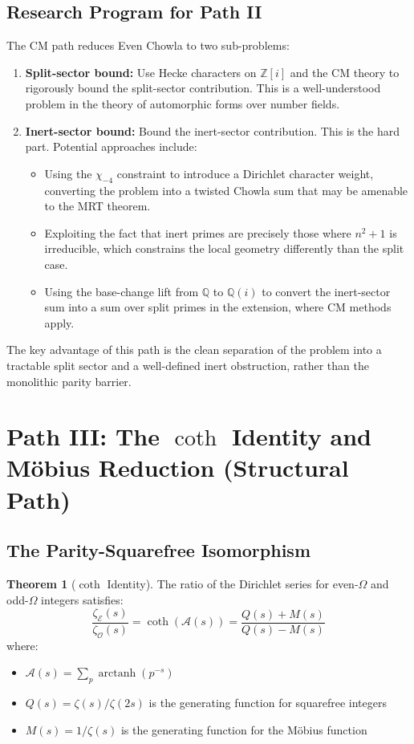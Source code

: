 \documentclass[11pt,a4paper]{article}
\theoremstyle{definition}
\newtheorem{theorem}{Theorem}[section]
\newcommand{\EE}{\mathcal{E}}
\newcommand{\OO}{\mathcal{O}}
\renewcommand{\AA}{\mathcal{A}}
\DeclareMathOperator{\arctanh}{arctanh}
\begin{document}
\subsection{Research Program for Path II}

The CM path reduces Even Chowla to two sub-problems:

\begin{enumerate}
\item \textbf{Split-sector bound:} Use Hecke characters on $\mathbb{Z}[i]$ and the CM theory to rigorously bound the split-sector contribution. This is a well-understood problem in the theory of automorphic forms over number fields.

\item \textbf{Inert-sector bound:} Bound the inert-sector contribution. This is the hard part. Potential approaches include:
\begin{itemize}
\item Using the $\chi_{-4}$ constraint to introduce a Dirichlet character weight, converting the problem into a twisted Chowla sum that may be amenable to the MRT theorem.
\item Exploiting the fact that inert primes are precisely those where $n^2+1$ is irreducible, which constrains the local geometry differently than the split case.
\item Using the base-change lift from $\mathbb{Q}$ to $\mathbb{Q}(i)$ to convert the inert-sector sum into a sum over split primes in the extension, where CM methods apply.
\end{itemize}
\end{enumerate}

The key advantage of this path is the clean separation of the problem into a tractable split sector and a well-defined inert obstruction, rather than the monolithic parity barrier.

\section{Path III: The $\coth$ Identity and M\"obius Reduction (Structural Path)}

\subsection{The Parity-Squarefree Isomorphism}

\begin{theorem}[$\coth$ Identity]
\label{thm:coth}
The ratio of the Dirichlet series for even-$\Omega$ and odd-$\Omega$ integers satisfies:
\begin{equation}
\frac{\zeta_{\EE}(s)}{\zeta_{\OO}(s)} = \coth(\AA(s)) = \frac{Q(s) + M(s)}{Q(s) - M(s)}
\end{equation}
where:
\begin{itemize}
\item $\AA(s) = \sum_p \arctanh(p^{-s})$
\item $Q(s) = \zeta(s)/\zeta(2s)$ is the generating function for squarefree integers
\item $M(s) = 1/\zeta(s)$ is the generating function for the M\"obius function
\end{itemize}
\end{theorem}
\end{document}
